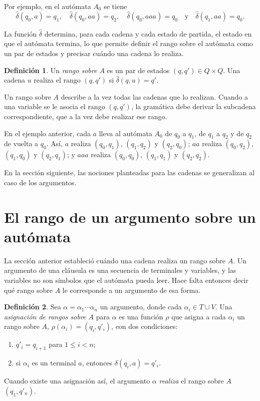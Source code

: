 \documentclass{report}
\theoremstyle{definition}
\newtheorem{definicion}{Definición}[chapter]
\theoremstyle{plain}
\theoremstyle{remark}
\begin{document}
Por ejemplo, en el autómata $A_0$ se tiene
\[
  \hat\delta(q_0, a) = q_1, \quad \hat\delta(q_0, aa) = q_2, \quad
  \hat\delta(q_0, aaa) = q_0 \quad\text{y}\quad \hat\delta(q_1, aa) = q_0.
\]

La función $\hat\delta$ determina, para cada cadena y cada estado de
partida, el estado en que el autómata termina, lo que permite definir el
rango sobre el autómata como un par de estados y precisar cuándo una
cadena lo realiza.

\begin{definicion}
Un \emph{rango sobre $A$} es un par de estados $(q, q') \in Q \times Q$.
Una cadena $u$ realiza el rango $(q, q')$ si $\hat\delta(q, u) = q'$.
\end{definicion}

Un rango sobre $A$ describe a la vez todas las cadenas que lo realizan.
Cuando a una variable se le asocia el rango $(q, q')$, la gramática debe
derivar la subcadena correspondiente, que a la vez debe realizar ese
rango.

En el ejemplo anterior, cada $a$ lleva al autómata $A_0$ de $q_0$ a
$q_1$, de $q_1$ a $q_2$ y de $q_2$ de vuelta a $q_0$. Así, $a$ realiza $(q_0, q_1)$,
$(q_1, q_2)$ y $(q_2, q_0)$; $aa$ realiza $(q_0, q_2)$, $(q_1, q_0)$ y
$(q_2, q_1)$; y $aaa$ realiza $(q_0, q_0)$, $(q_1, q_1)$ y $(q_2, q_2)$.

En la sección siguiente, las nociones planteadas para las cadenas se
generalizan al caso de los argumentos.

\section{El rango de un argumento sobre un autómata}\label{sec:rango-argumento}

La sección anterior estableció cuándo una cadena realiza un rango sobre
$A$. Un argumento de una cláusula es una secuencia de terminales y
variables, y las variables no son símbolos que el autómata pueda leer.
Hace falta entonces decir qué rango sobre $A$ le corresponde a un
argumento de esa forma.

\begin{definicion}
Sea $\alpha = \alpha_1 \cdots \alpha_n$ un argumento, donde cada
$\alpha_i \in T \cup V$. Una \emph{asignación de rangos sobre $A$} para
$\alpha$ es una función $\rho$ que asigna a cada $\alpha_i$ un rango
sobre $A$, $\rho(\alpha_i) = (q_i, q'_i)$, con dos condiciones:
\begin{enumerate}
  \item $q'_i = q_{i+1}$ para $1 \le i < n$;
  \item si $\alpha_i$ es un terminal $a$, entonces $\delta(q_i, a) = q'_i$.
\end{enumerate}
Cuando existe una asignación así, el argumento $\alpha$ \emph{realiza}
el rango sobre $A$ $(q_1, q'_n)$.
\end{definicion}
\end{document}
